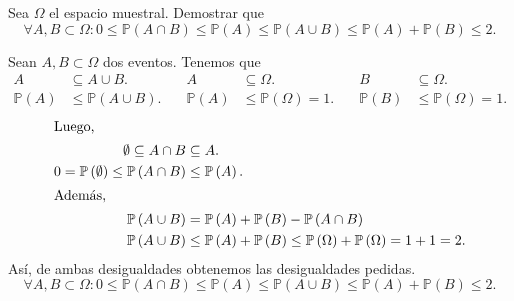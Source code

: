 \question

Sea $\Omega$ el espacio muestral.
Demostrar que
\begin{equation*}
	\forall A,B\subset\Omega:
	0\leq
	\mathbb{P}\left(A\cap B\right)\leq
	\mathbb{P}\left(A\right)\leq
	\mathbb{P}\left(A\cup B\right)\leq
	\mathbb{P}\left(A\right)+
	\mathbb{P}\left(B\right)\leq
	2.
\end{equation*}

\begin{solutionordottedlines}
	Sean $A,B\subset\Omega$ dos eventos.
	Tenemos que
	\begin{equation*}
		\begin{aligned}
			A                        & \subseteq A\cup B. \\
			\mathbb{P}\left(A\right) & \leq
			\mathbb{P}\left(A\cup B\right).
		\end{aligned}\quad
		\begin{aligned}
			A                        & \subseteq \Omega. \\
			\mathbb{P}\left(A\right) & \leq
			\mathbb{P}\left(\Omega\right)=1.
		\end{aligned}\quad
		\begin{aligned}
			B                        & \subseteq \Omega. \\
			\mathbb{P}\left(B\right) & \leq
			\mathbb{P}\left(\Omega\right)=1.
		\end{aligned}
	\end{equation*}
	\vspace*{-\baselineskip}\setlength\belowdisplayshortskip{0pt}
	\begin{align*}
		\shortintertext{Luego,}
		\emptyset\subseteq A\cap B                                           & \subseteq A. \\
		0=\mathbb{P}\left(\emptyset\right)\leq\mathbb{P}\left(A\cap B\right) & \leq
		\mathbb{P}\left(A\right).                                                           \\
		\shortintertext{Además,}
		\mathbb{P}\left(A\cup B\right)                                       & =
		\mathbb{P}\left(A\right)+
		\mathbb{P}\left(B\right)-
		\mathbb{P}\left(A\cap B\right)                                                      \\
		\mathbb{P}\left(A\cup B\right)                                       & \leq
		\mathbb{P}\left(A\right)+
		\mathbb{P}\left(B\right)\leq \mathbb{P}\left(\Omega\right)+\mathbb{P}\left(\Omega\right)=1+1=2.
	\end{align*}
	Así, de ambas desigualdades obtenemos las desigualdades pedidas.
	\begin{equation*}
		\forall A,B\subset\Omega:
		0\leq
		\mathbb{P}\left(A\cap B\right)\leq
		\mathbb{P}\left(A\right)\leq
		\mathbb{P}\left(A\cup B\right)\leq
		\mathbb{P}\left(A\right)+
		\mathbb{P}\left(B\right)\leq
		2.
	\end{equation*}
\end{solutionordottedlines}

